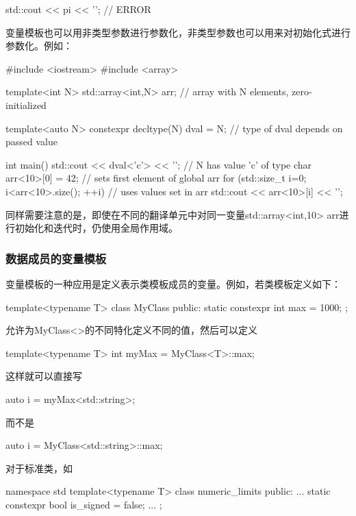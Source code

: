 \begin{cpp}
std::cout << pi << '\n'; // ERROR
\end{cpp}

变量模板也可以用非类型参数进行参数化，非类型参数也可以用来对初始化式进行参数化。例如：

\begin{cpp}
#include <iostream>
#include <array>

template<int N>
std::array<int,N> arr{}; // array with N elements, zero-initialized

template<auto N>
	constexpr decltype(N) dval = N; // type of dval depends on passed value

int main() {
	std::cout << dval<'c'> << '\n'; // N has value 'c' of type char
	arr<10>[0] = 42; // sets first element of global arr
	for (std::size_t i=0; i<arr<10>.size(); ++i) { // uses values set in arr
		std::cout << arr<10>[i] << '\n';
	}
}
\end{cpp}

同样需要注意的是，即使在不同的翻译单元中对同一变量std::array<int,10> arr进行初始化和迭代时，仍使用全局作用域。

\subsubsection{数据成员的变量模板}

变量模板的一种应用是定义表示类模板成员的变量。例如，若类模板定义如下：

\begin{cpp}
template<typename T>
class MyClass {
	public:
	static constexpr int max = 1000;
};
\end{cpp}

允许为MyClass<>的不同特化定义不同的值，然后可以定义

\begin{cpp}
template<typename T>
int myMax = MyClass<T>::max;
\end{cpp}

这样就可以直接写

\begin{cpp}
auto i = myMax<std::string>;
\end{cpp}

而不是

\begin{cpp}
auto i = MyClass<std::string>::max;
\end{cpp}

对于标准类，如

\begin{cpp}
namespace std {
	template<typename T> class numeric_limits {
		public:
		...
		static constexpr bool is_signed = false;
		...
	};
}
\end{cpp}


